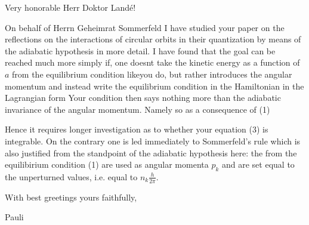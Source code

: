 \begin{letter}{3}
\begin{header}
\date{1919/12/18}

\makeheader

\end{header}

Very honorable Herr Doktor Land\'e!

On behalf of Herrn Geheimrat Sommerfeld I have studied your paper on the reflections on the interactions of circular orbits in their quantization by means of the adiabatic hypothesis in more detail. I have found that the goal can be reached much more simply if, one doesnt take the kinetic energy as a function of $a$ from the equilibrium condition likeyou do, but rather introduces the angular momentum and instead write the equilibrium condition in the Hamiltonian in the Lagrangian form
Your condition
then says nothing more than the adiabatic invariance of the angular momentum. Namely
so as a consequence of (1)

Hence it requires longer investigation as to whether your equation (3) is integrable. On the contrary one is led immediately to Sommerfeld's rule which is also justified from the standpoint of the adiabatic hypothesis here: the  from the equilibirium condition (1) are used as angular momenta $p_k$ and are set equal to the unperturned values, i.e. equal to $n_k\frac{h}{2\pi}$.

With best greetings yours faithfully,

Pauli
\end{letter}